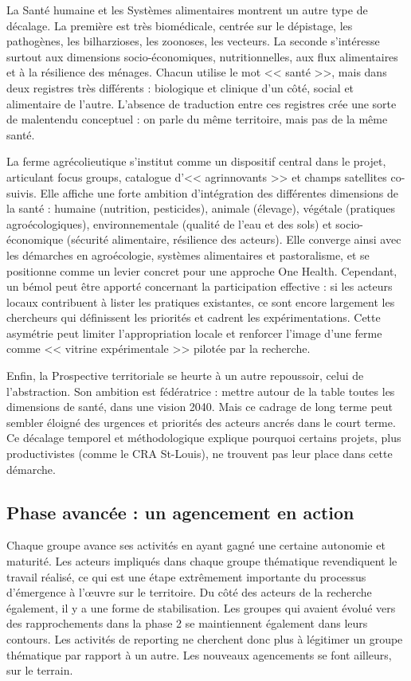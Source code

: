 \documentclass{article}
\begin{document}
La Santé humaine et les Systèmes alimentaires montrent un autre type de décalage. La première est très biomédicale, centrée sur le dépistage, les pathogènes, les bilharzioses, les zoonoses, les vecteurs. La seconde s’intéresse surtout aux dimensions socio-économiques, nutritionnelles, aux flux alimentaires et à la résilience des ménages. Chacun utilise le mot << santé >>, mais dans deux registres très différents : biologique et clinique d’un côté, social et alimentaire de l’autre. L’absence de traduction entre ces registres crée une sorte de malentendu conceptuel : on parle du même territoire, mais pas de la même santé.

La ferme agrécolieutique s'institut comme un dispositif central dans le projet, articulant focus groups, catalogue d’<< agrinnovants >> et champs satellites co-suivis. Elle affiche une forte ambition d’intégration des différentes dimensions de la santé : humaine (nutrition, pesticides), animale (élevage), végétale (pratiques agroécologiques), environnementale (qualité de l’eau et des sols) et socio-économique (sécurité alimentaire, résilience des acteurs). Elle converge ainsi avec les démarches en agroécologie, systèmes alimentaires et pastoralisme, et se positionne comme un levier concret pour une approche One Health. Cependant, un bémol peut être apporté concernant la participation effective : si les acteurs locaux contribuent à lister les pratiques existantes, ce sont encore largement les chercheurs qui définissent les priorités et cadrent les expérimentations. Cette asymétrie peut limiter l’appropriation locale et renforcer l’image d’une ferme comme << vitrine expérimentale >> pilotée par la recherche.

Enfin, la Prospective territoriale se heurte à un autre repoussoir, celui de l’abstraction. Son ambition est fédératrice : mettre autour de la table toutes les dimensions de santé, dans une vision 2040. Mais ce cadrage de long terme peut sembler éloigné des urgences et priorités des acteurs ancrés dans le court terme. Ce décalage temporel et méthodologique explique pourquoi certains projets, plus productivistes (comme le CRA St-Louis), ne trouvent pas leur place dans cette démarche.

\subsection{Phase avancée : un agencement en action}\label{sec:phaseAgencements}

Chaque groupe avance ses activités en ayant gagné une certaine autonomie et maturité. Les acteurs impliqués dans chaque groupe thématique revendiquent le travail réalisé, ce qui est une étape extrêmement importante du processus d'émergence à l'œuvre sur le territoire. Du côté des acteurs de la recherche également, il y a une forme de stabilisation. Les groupes qui avaient évolué vers des rapprochements dans la phase 2 se maintiennent également dans leurs contours. Les activités de reporting ne cherchent donc plus à légitimer un groupe thématique par rapport à un autre. Les nouveaux agencements se font ailleurs, sur le terrain. 
\end{document}
